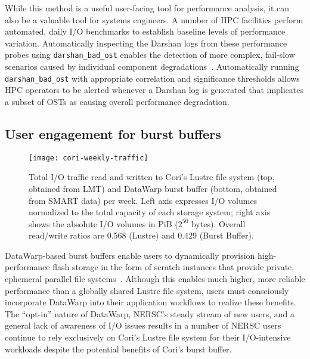 While this method is a useful user-facing tool for performance analysis, it can also be a valuable tool for systems engineers.
A number of HPC facilities perform automated, daily I/O benchmarks to establish baseline levels of performance variation\cite{Lockwood2017,Simakov2015}.
Automatically inspecting the Darshan logs from these performance probes using  \texttt{darshan\_bad\_ost} enables the detection of more complex, fail-slow scenarios caused by individual component degradations~\cite{Gunawi2018}.
Automatically running \texttt{darshan\_bad\_ost} with appropriate correlation and significance thresholds allows HPC operators to be alerted whenever a Darshan log is generated that implicates a subset of OSTs as causing overall performance degradation.

\subsection{User engagement for burst buffers}
\label{sec:results/bb}

\begin{figure}
    \centering
    \texttt{[image: cori-weekly-traffic]}
    \caption{%
    Total I/O traffic read and written to Cori's Lustre file system (top, obtained from LMT) and DataWarp burst buffer (bottom, obtained from SMART data) per week.
    Left axis expresses I/O volumes normalized to the total capacity of each storage system; right axis shows the absolute I/O volumes in PiB ($2^{50}$ bytes).
    Overall read/write ratios are 0.568 (Lustre) and 0.429 (Burst Buffer).
    }
    \label{fig:cori-weekly-traffic}
    \vspace{-.2in}
\end{figure}

DataWarp-based burst buffers enable users to dynamically provision high-performance flash storage in the form of scratch instances that provide private, ephemeral parallel file systems~\cite{Henseler2016}.
Although this enables much higher, more reliable performance than a globally shared Lustre file system, users must consciously incorporate DataWarp into their application workflows to realize these benefits.
The ``opt-in'' nature of DataWarp, NERSC's steady stream of new users, and a general lack of awareness of I/O issues results in a number of NERSC users continue to rely exclusively on Cori's Lustre file system for their I/O-intensive workloads despite the potential benefits of Cori's burst buffer.

